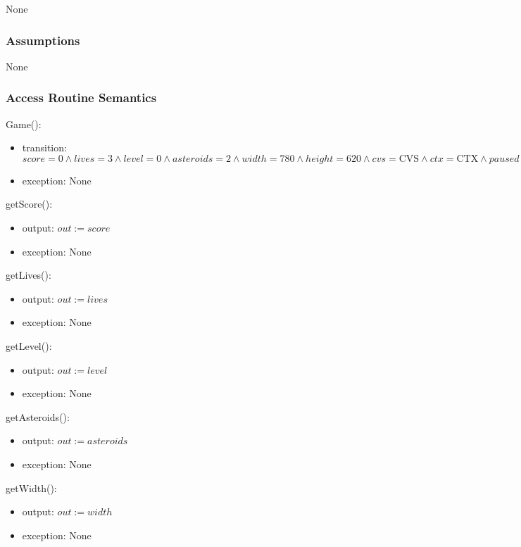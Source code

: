 \documentclass[12pt]{article}
\begin{document}
None

\subsubsection*{Assumptions}

%

None

\subsubsection*{Access Routine Semantics}

Game():
\begin{itemize}
    \item transition: $score = 0 \land lives = 3 \land level = 0 \land asteroids = 2 \land width = 780 \land height = 620 \land cvs = \mbox{CVS} \land ctx = \mbox{CTX} \land paused = false \land sprites = \mbox{seq. of OBJECT} \land muteSound = FPS \land pauseGame = FPS$
    \item exception: None
\end{itemize}

\noindent getScore():
\begin{itemize}
    \item output: $out := score$
    \item exception: None
\end{itemize}

\noindent getLives():
\begin{itemize}
    \item output: $out := lives$
    \item exception: None
\end{itemize}

\noindent getLevel():
\begin{itemize}
    \item output: $out := level$
    \item exception: None
\end{itemize}

\noindent getAsteroids():
\begin{itemize}
    \item output: $out := asteroids$
    \item exception: None
\end{itemize}

\noindent getWidth():
\begin{itemize}
    \item output: $out := width$
    \item exception: None
\end{itemize}
\end{document}
